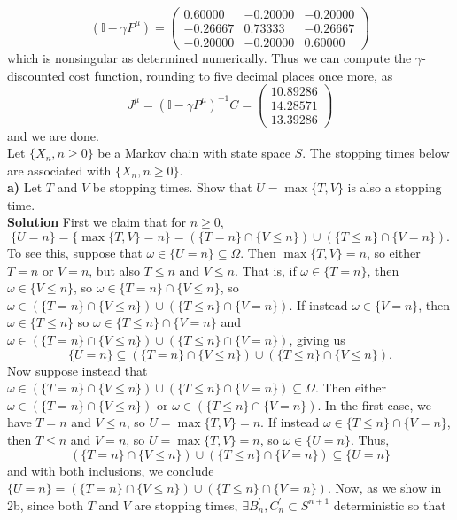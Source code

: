 \documentclass[11pt, letterpaper]{article}
\newcommand{\mbb}[1]{\mathbb{#1}}
\begin{document}
    \[(\mbb{I}-\gamma P^\mu)=\begin{pmatrix}
        0.60000 & -0.20000 & -0.20000\\
        -0.26667 & 0.73333 & -0.26667\\
        -0.20000 & -0.20000 & 0.60000
    \end{pmatrix}\]
    which is nonsingular as determined numerically. Thus we can compute the $\gamma$-discounted cost function, rounding to five decimal places once more, as
    \[J^\mu=(\mbb{I}-\gamma P^\mu)^{-1}C=\begin{pmatrix}
        10.89286\\
        14.28571\\
        13.39286
    \end{pmatrix}\]
    and we are done.\\[10pt]
     Let $\{X_n,n\geq 0\}$ be a Markov chain with state space $S$. The stopping times below are associated with $\{X_n,n\geq 0\}$.\\[10pt]
    {\bf a)} Let $T$ and $V$ be stopping times. Show that $U=\max\{T,V\}$ is also a stopping time.\\[10pt]
    {\bf Solution} First we claim that for $n\geq 0$, 
    \[\{U=n\}=\{\max\{T,V\}=n\}=\left(\{T=n\}\cap\{V\leq n\}\right)\cup\left(\{T\leq n\}\cap\{V=n\}\right).\]
    To see this, suppose that $\omega\in\{U=n\}\subseteq\Omega$. Then $\max\{T,V\}=n$, so either $T=n$ or $V=n$, but also $T\leq n$ and $V\leq n$. That is, if $\omega\in\{T=n\}$, then $\omega\in\{V\leq n\}$, so $\omega\in\{T=n\}\cap\{V\leq n\}$, so 
    $\omega\in(\{T=n\}\cap\{V\leq n\})\cup(\{T\leq n\}\cap\{V=n\})$. If instead $\omega\in\{V=n\}$, then $\omega\in\{T\leq n\}$ so $\omega\in\{T\leq n\}\cap\{V=n\}$ and $\omega\in(\{T=n\}\cap\{V\leq n\})\cup(\{T\leq n\}\cap\{V=n\})$, giving us
    \[\{U=n\}\subseteq(\{T=n\}\cap\{V\leq n\})\cup(\{T\leq n\}\cap\{V\leq n\}).\]
    Now suppose instead that $\omega\in(\{T=n\}\cap\{V\leq n\})\cup(\{T\leq n\}\cap\{V=n\})\subseteq\Omega$. Then either $\omega\in(\{T=n\}\cap\{V\leq n\})$ or $\omega\in(\{T\leq n\}\cap\{V=n\})$. In the first case, we have $T=n$ and $V\leq n$, so $U=\max\{T,V\}=n$. If instead
    $\omega\in\{T\leq n\}\cap\{V=n\}$, then $T\leq n$ and $V=n$, so $U=\max\{T,V\}=n$, so $\omega\in\{U=n\}$. Thus,
    \[(\{T=n\}\cap\{V\leq n\})\cup(\{T\leq n\}\cap\{V=n\})\subseteq\{U=n\}\]
    and with both inclusions, we conclude $\{U=n\}=(\{T=n\}\cap\{V\leq n\})\cup(\{T\leq n\}\cap\{V=n\})$. 
    Now, as we show in 2b, since both $T$ and $V$ are stopping times, $\exists B^\prime_n,C^\prime_n\subset S^{n+1}$ deterministic so that
\end{document}
